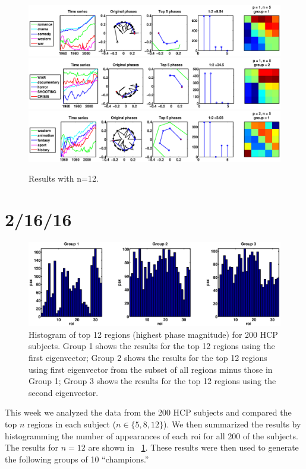 \documentclass[11pt]{article}
\begin{document}
\begin{figure}[H]
\includegraphics[trim = 0 0 130 0, clip, width=\textwidth]{pictures/movie_word_data_1955-2015_p1_n5_gp1.eps}
\includegraphics[trim = 0 0 130 0, clip, width=\textwidth]{pictures/movie_word_data_1955-2015_p1_n5_gp2.eps}
\includegraphics[trim = 0 0 130 0, clip, width=\textwidth]{pictures/movie_word_data_1955-2015_p2_n5_gp1.eps}
\caption{Results with n=12.}
\end{figure}

\section{2/16/16}
\begin{figure}
\label{fig:top12hist}
\includegraphics[trim = 50 0 50 0, clip, width = \textwidth]{pictures/refine_cyclicity_output_n12.eps}
\caption{Histogram of top 12 regions (highest phase magnitude) for 200 HCP subjects. Group 1 shows the results for the top 12 regions using the first eigenvector; Group 2 shows the results for the top 12 regions using first eigenvector from the subset of all regions minus those in Group 1; Group 3 shows the results for the top 12 regions using the second eigenvector.}
\end{figure}
This week we analyzed the data from the 200 HCP subjects and compared the top $n$ regions in each subject ($n \in \{5,8,12\}$). We then summarized the results by histogramming the number of appearances of each roi for all 200 of the subjects. The results for $n=12$ are shown in ~\ref{fig:top12hist}. These results were then used to generate the following groups of 10 ``champions.''
\end{document}
